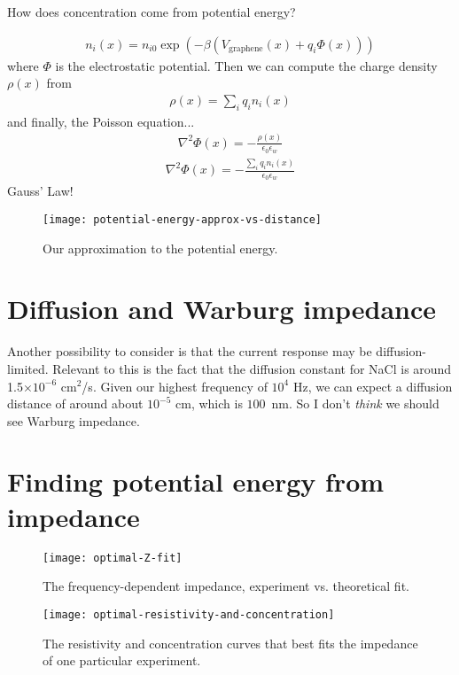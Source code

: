\documentclass[twocolumn]{revtex4-1}
\begin{document}
How does concentration come from potential energy?

\begin{align}
  n_i(x) = n_{i0} \exp\left(-\beta \left(V_{\text{graphene}}(x)
                                       + q_i \Phi(x)\right)\right)
\end{align}
where $\Phi$ is the electrostatic potential.  Then we can compute the
charge density $\rho(x)$ from
\begin{align}
  \rho(x) = \sum_i q_i n_i(x)
\end{align}
and finally, the Poisson equation...
\begin{align}
  \nabla^2 \Phi(x) = -\frac{\rho(x)}{\epsilon_0\epsilon_w}
\end{align}
\begin{align}
  \nabla^2 \Phi(x) = -\frac{\sum_i q_i n_i(x)}{\epsilon_0\epsilon_w}
\end{align}
Gauss' Law!

\begin{figure}
  \texttt{[image: potential-energy-approx-vs-distance]}
  \caption{Our approximation to the potential
    energy.}\label{fig:pot-energy-approx}
\end{figure}


\section{Diffusion and Warburg impedance}

Another possibility to consider is that the current response may be
diffusion-limited.  Relevant to this is the fact that the diffusion
constant for NaCl is around 1.5$\times 10^{-6}$ cm$^2$/s.  Given our
highest frequency of $10^4$ Hz, we can expect a diffusion distance of
around about $10^{-5}$ cm, which is $100$~nm.  So I don't \emph{think}
we should see Warburg impedance.


\clearpage

\section{Finding potential energy from impedance}

\begin{figure}
  \texttt{[image: optimal-Z-fit]}
  \caption{The frequency-dependent impedance, experiment
    vs. theoretical fit.}\label{fig:optimal-Z-fit}
\end{figure}

\begin{figure}
  \texttt{[image: optimal-resistivity-and-concentration]}
  \caption{The resistivity and concentration curves that best fits the
    impedance of one particular
    experiment.}\label{fig:optimal-resistivity-and-concentration}
\end{figure}
\end{document}
